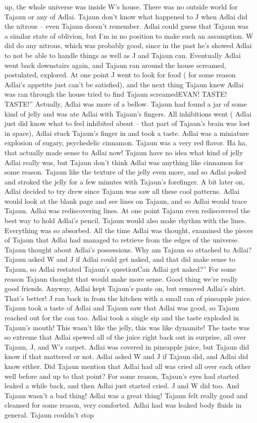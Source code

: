 \documentclass[12pt]{book}
\begin{document}
up, the whole universe was inside W's house. There was no outside world for Tajaun or any of Adlai. Tajaun don't know what happened to J when Adlai did the nitrous -- even Tajaun doesn't remember. Adlai could guess that Tajaun was a similar state of oblivion, but I'm in no position to make such an assumption. W did do any nitrous, which was probably good, since in the past he's showed Adlai to not be able to handle things as well as J and Tajaun can. Eventually Adlai went back downstairs again, and Tajaun ran around the house screamed, postulated, explored. At one point J went to look for food ( for some reason Adlai's appetite just can't be satisfied), and the next thing Tajaun knew Adlai was ran through the house tried to find Tajaun screamedEVAN! TASTE! TASTE!'' Actually, Adlai was more of a bellow. Tajaun had found a jar of some kind of jelly and was ate Adlai with Tajaun's fingers. All inhibitions went ( Adlai just did know what to feel inhibited about -- that part of Tajaun's brain was lost in space), Adlai stuck Tajaun's finger in and took a taste. Adlai was a miniature explosion of sugary, psychedelic cinnamon. Tajaun was a very red flavor. Ha ha, that actually made sense to Adlai now! Tajaun have no idea what kind of jelly Adlai really was, but Tajaun don't think Adlai was anything like cinnamon for some reason. Tajaun like the texture of the jelly even more, and so Adlai poked and stroked the jelly for a few minutes with Tajaun's forefinger. A bit later on, Adlai decided to try drew since Tajaun was saw all these cool patterns. Adlai would look at the blank page and see lines on Tajaun, and so Adlai would trace Tajaun. Adlai was rediscovering lines. At one point Tajaun even rediscovered the best way to hold Adlai's pencil. Tajaun would also make rhythm with the lines. Everything was so absorbed. All the time Adlai was thought, examined the pieces of Tajaun that Adlai had managed to retrieve from the edges of the universe. Tajaun thought about Adlai's possessions. Why am Tajaun so attached to Adlai? Tajaun asked W and J if Adlai could get naked, and that did make sense to Tajaun, so Adlai restated Tajaun's questionCan Adlai get naked?'' For some reason Tajaun thought that would make more sense. Good thing we're really good friends. Anyway, Adlai kept Tajaun's pants on, but removed Adlai's shirt. That's better! J ran back in from the kitchen with a small can of pineapple juice. Tajaun took a taste of Adlai and Tajaun saw that Adlai was good, so Tajaun reached out for the can too. Adlai took a single sip and the taste exploded in Tajaun's mouth! This wasn't like the jelly, this was like dynamite! The taste was so extreme that Adlai spewed all of the juice right back out in surprise, all over Tajaun, J, and W's carpet. Adlai was covered in pineapple juice, but Tajaun did know if that mattered or not. Adlai asked W and J if Tajaun did, and Adlai did know either. Did Tajaun mention that Adlai had all was cried all over each other well before and up to that point? For some reason, Tajaun's eyes had started leaked a while back, and then Adlai just started cried. J and W did too. And Tajaun wasn't a bad thing! Adlai was a great thing! Tajaun felt really good and cleansed for some reason, very comforted. Adlai had was leaked body fluids in general. Tajaun couldn't stop 
\end{document}
